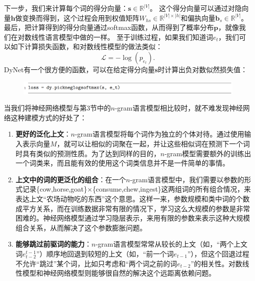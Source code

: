 \documentclass[10pt,a4paper]{ctexart}
\begin{document}
下一步，我们来计算每个词的得分向量：$\textbf{s} \in \mathbb{R}^{|V|}$。
这个得分向量可以通过对隐向量$\textbf{h}$做变换而得到，这个过程会用到权值矩阵$W_{hs} \in \mathbb{R}^{|V| \times |h|}$和偏执向量$\textbf{b}_s \in \mathbb{R}^{|V|}$。
最后，把计算得到的得分向量通过softmax函数，从而得到了概率分布$\textbf{p}$，就像我们在对数线性语言模型中做的一样。
至于训练过程，如果我们知道词$e_t$，我们可以如下计算损失函数，和对数线性模型的做法类似：
\[
 \mathcal{L} = - \log (p_{e_t}).
\]
DyNet有一个很方便的函数，可以在给定得分向量$\textbf{s}$时计算出负对数似然损失值：

\begin{figure}[H]
\centering
\includegraphics[width=1\textwidth]{fig131.png}
\end{figure}

当我们将神经网络模型与第3节中的$n$-gram语言模型相比较时，就不难发现神经网络这种建模方式的好处了：
\begin{enumerate}
\item[] \textbf{更好的泛化上文}：$n$-gram语言模型将每个词作为独立的个体对待。通过使用输入表示向量$M$，就可以让相似的词聚在一起，并让这些相似词在预测下一个词时具有类似的预测性质。为了达到同样的目的，$n$-gram模型需要额外的训练出一个词类来，而且能有效的使用这个词类信息并不是一件简单的事情\cite{brown1992class}。
\item[] \textbf{上文中的词的更泛化的组合}：在一个$n$-gram语言模型中，我们需要以参数的形式记录\{cow,horse,goat\}$\times$\{consume,chew,ingest\}这两组词的所有组合情况，来表达上文“农场动物吃的东西”这个意思。这样一来，参数规模和类中词的个数成平方关系，而在训练数据非常有限的情况下，学习这么大规模的参数是非常困难的。神经网络模型通过学习隐层表示，来用有限的参数来表示这种大规模组合关系，从而解决了这个参数膨胀问题。
\item[] \textbf{能够跳过前驱词的能力}：$n$-gram语言模型常常从较长的上文（如，“两个上文词$e_{t-2}^{t-1}$”）顺序地回退到较短的上文（如，“前一个词$e_{t-1}$”），但这个回退过程不允许“跳过”某个词，比如只考虑和“两个词之前的词$e_{t-2}$”的相关性。对数线性模型和神经网络模型则能够很自然的解决这个远距离依赖问题。
\end{enumerate}
\end{document}
